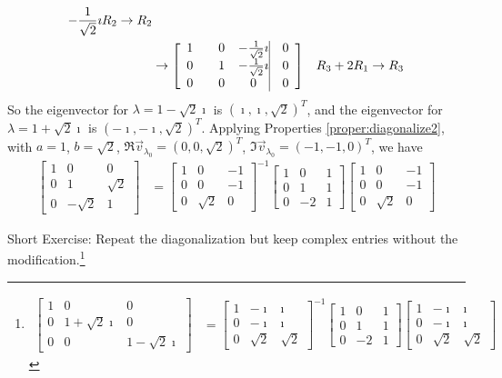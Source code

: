 \begin{solution}
\begin{align*}
\begin{aligned}
-\frac{1}{\sqrt{2}}\imath R_2 &\to R_2 \\
\end{aligned} \\
&\to  
\left[\begin{array}{@{}wc{15pt}wc{15pt}wc{15pt}|wc{15pt}@{}}
1 & 0 & -\frac{1}{\sqrt{2}}\imath & 0 \\
0 & 1 & -\frac{1}{\sqrt{2}}\imath & 0 \\
0 & 0 & 0 & 0
\end{array}\right] & R_3 + 2R_1 \to R_3 
\end{align*}
So the eigenvector for $\lambda = 1 - \sqrt{2}\imath$ is $(\imath, \imath, \sqrt{2})^T$, and the eigenvector for $\lambda = 1 + \sqrt{2}\imath$ is $(-\imath, -\imath, \sqrt{2})^T$. Applying Properties \ref{proper:diagonalize2}, with $a = 1$, $b = \sqrt{2}$, $\Re{\vec{v}_{\lambda_0}} = (0,0,\sqrt{2})^T$, $\Im{\vec{v}_{\lambda_0}} = (-1,-1,0)^T$, we have
\begin{align*}
\begin{bmatrix}
1 & 0 & 0 \\
0 & 1 & \sqrt{2} \\
0 & -\sqrt{2} & 1
\end{bmatrix}
&= 
\begin{bmatrix}
1 & 0 & -1 \\
0 & 0 & -1 \\
0 & \sqrt{2} & 0 
\end{bmatrix}^{-1}
\begin{bmatrix}
1 & 0 & 1 \\
0 & 1 & 1 \\
0 & -2 & 1
\end{bmatrix}
\begin{bmatrix}
1 & 0 & -1 \\
0 & 0 & -1 \\
0 & \sqrt{2} & 0 
\end{bmatrix}
\end{align*}
\end{solution}
Short Exercise: Repeat the diagonalization but keep complex entries without the modification.\footnote{
\begin{align*}
\begin{bmatrix}
1 & 0 & 0 \\
0 & 1+\sqrt{2}\imath & 0 \\
0 & 0 & 1-\sqrt{2}\imath
\end{bmatrix}
&= 
\begin{bmatrix}
1 & -\imath & \imath \\
0 & -\imath & \imath \\
0 & \sqrt{2} & \sqrt{2} 
\end{bmatrix}^{-1}
\begin{bmatrix}
1 & 0 & 1 \\
0 & 1 & 1 \\
0 & -2 & 1
\end{bmatrix}
\begin{bmatrix}
1 & -\imath & \imath \\
0 & -\imath & \imath \\
0 & \sqrt{2} & \sqrt{2} 
\end{bmatrix}   
\end{align*}}

